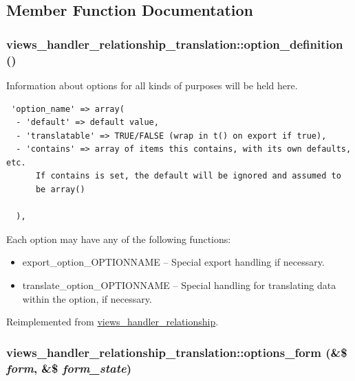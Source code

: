 \subsection{Member Function Documentation}
\hypertarget{classviews__handler__relationship__translation_0bf8fe73b167b63fd5ac38bd5e8b1efe}{
\subsubsection[{option\_\-definition}]{\setlength{\rightskip}{0pt plus 5cm}views\_\-handler\_\-relationship\_\-translation::option\_\-definition ()}}
\label{classviews__handler__relationship__translation_0bf8fe73b167b63fd5ac38bd5e8b1efe}


Information about options for all kinds of purposes will be held here. 

\begin{Code}\begin{verbatim} 'option_name' => array(
  - 'default' => default value,
  - 'translatable' => TRUE/FALSE (wrap in t() on export if true),
  - 'contains' => array of items this contains, with its own defaults, etc.
      If contains is set, the default will be ignored and assumed to
      be array()

  ),
\end{verbatim}
\end{Code}

 Each option may have any of the following functions:\begin{itemize}
\item export\_\-option\_\-OPTIONNAME -- Special export handling if necessary.\item translate\_\-option\_\-OPTIONNAME -- Special handling for translating data within the option, if necessary. \end{itemize}


Reimplemented from \hyperlink{classviews__handler__relationship_7e7b7a0056836612aa50a60575a3d549}{views\_\-handler\_\-relationship}.\hypertarget{classviews__handler__relationship__translation_ca4668f3619b0fc6182e12cbaf38b633}{
\subsubsection[{options\_\-form}]{\setlength{\rightskip}{0pt plus 5cm}views\_\-handler\_\-relationship\_\-translation::options\_\-form (\&\$ {\em form}, \/  \&\$ {\em form\_\-state})}}
\label{classviews__handler__relationship__translation_ca4668f3619b0fc6182e12cbaf38b633}


